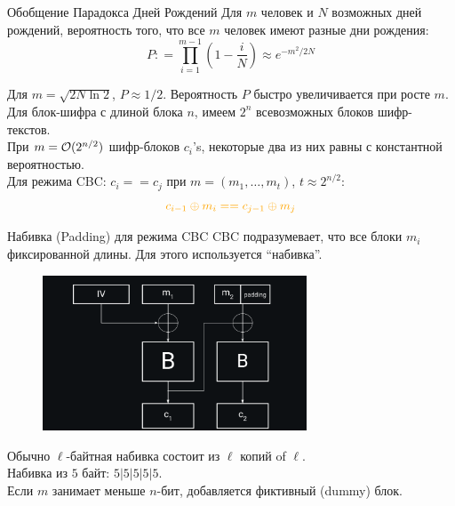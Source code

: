 \documentclass[usenames,dvipsnames,8pt,aspectratio=169]{beamer}
\begin{document}
\begin{frame}{Обобщение Парадокса Дней Рождений}
\Large
Для $m$ человек и $N$ возможных дней рождений, вероятность того, что все $m$ человек имеют разные дни рождения:
\[
P : = \prod_{i=1}^{m-1} \left(  1  -\frac{i}{N} \right) \approx e^{-m^2/2N}
\]

Для $m = \sqrt{2N \ln 2}$, $P \approx 1/2$.  Вероятность $P$ быстро увеличивается при росте $m$. \\[10pt]

\pause
Для блок-шифра с длиной блока $n$, имеем $2^{n}$ всевозможных блоков шифр-текстов.\\
При {\color{Orange} $m = \mathcal{O}(2^{n/2})$ } шифр-блоков $c_i$'s, некоторые два из них равны с константной вероятностью.\\[15pt]

Для режима CBC: $c_i == c_j$ при $m=(m_1, \ldots, m_t)$, {\color{Orange} $t \approx 2^{n/2}$}:
\Large
\[
{\color{Orange} c_{i-1} \oplus m_{i} == c_{j-1} \oplus m_{j}}
\]

\end{frame}


\begin{frame}{Набивка (Padding) для режима CBC}
\Large
CBC подразумевает, что все блоки $m_i$ фиксированной длины. Для этого используется ``набивка''.
\begin{figure}
\includegraphics[width=0.70\textwidth]{CBC_Padding}
\end{figure}
Обычно $\ell$-байтная набивка состоит из $\ell$ копий of $\ell$. \\
Набивка из $5$ байт: $5|5|5|5|5$. \\
Если $m$ занимает меньше $n$-бит, добавляется фиктивный (dummy) блок.
\end{frame}
\end{document}
